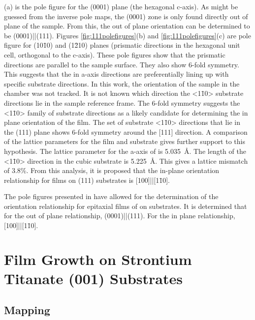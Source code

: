 (a) is the pole figure for the (0001) plane (the hexagonal
c-axis). As might be guessed from the inverse pole maps, the (0001) zone is only found
directly out of plane of the sample. From this, the out of plane orientation can be
determined to be (0001)||(111). Figures \ref{fig:111polefigures}(b)
and \ref{fig:111polefigures}(c) are pole figure for (10\={1}0) and (1\={2}10) planes
(prismatic directions in the hexagonal unit cell, orthogonal to the c-axis). These pole
figures show that the prismatic directions are parallel to the sample surface. They also
show 6-fold  symmetry. This suggests that the in a-axis directions are preferentially
lining up with specific substrate directions. In this work, the orientation of the sample
in the  chamber was not tracked. It is not known which direction the <1\={1}0>
substrate directions lie in the sample reference frame. The 6-fold symmetry suggests the
<1\={1}0> family of substrate directions as a likely candidate for determining the in
plane orientation of the  film. The set of substrate <1\={1}0> directions that
lie in the (111) plane shows 6-fold symmetry around the [111] direction. A comparison of
the lattice parameters for the film and substrate gives further support to this
hypothesis. The lattice parameter for the a-axis of  is \SI{5.035}{\angstrom}.
The length of the <1\={1}0> direction in the cubic substrate is \SI{5.225}{\angstrom}.
This gives a lattice mismatch of 3.8\%. From this analysis, it is proposed that the
in-plane orientation relationship for  films on  (111) substrates is
[100]||[1\={1}0]. 

The pole figures presented in  have allowed for the
determination of the orientation relationship for epitaxial films of  on
 substrates. It is determined that for the out of plane relationship,
(0001)||(111). For the in plane relationship,
[100]||[1\={1}0].


\section{Film Growth on Strontium Titanate (001) Substrates}
\label{sec:single.growth.001}


\subsection{ Mapping}
\label{subsec:single.growth.mapping}


